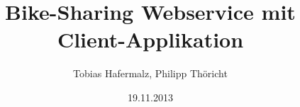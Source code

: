 \author{Tobias Hafermalz, Philipp Thöricht}
\title{Bike-Sharing Webservice mit Client-Applikation}
\date{19.11.2013}
\maketitle

